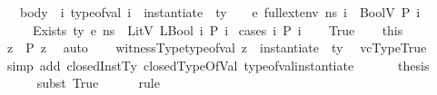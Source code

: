 \begin{isabellebody}
\ \ \ body{\isacharcolon}{\kern0pt}\ {\isachardoublequoteopen}{\isasymAnd}\ i{\isachardot}{\kern0pt}\ type{\isacharunderscore}{\kern0pt}of{\isacharunderscore}{\kern0pt}val\ i\ {\isacharequal}{\kern0pt}\ instantiate\ {\isasymOmega}\ ty\ {\isasymLongrightarrow}\ {\isasymLambda}{\isacharcomma}{\kern0pt}{\isasymGamma}{\isacharcomma}{\kern0pt}{\isasymOmega}\ {\isasymturnstile}\ {\isasymlangle}e{\isacharcomma}{\kern0pt}\ full{\isacharunderscore}{\kern0pt}ext{\isacharunderscore}{\kern0pt}env\ ns\ i{\isasymrangle}\ {\isasymDown}\ BoolV\ {\isacharparenleft}{\kern0pt}P\ i{\isacharparenright}{\kern0pt}{\isachardoublequoteclose}\isanewline
\ \ \ {\isachardoublequoteopen}{\isasymLambda}{\isacharcomma}{\kern0pt}{\isasymGamma}{\isacharcomma}{\kern0pt}{\isasymOmega}\ {\isasymturnstile}\ {\isasymlangle}Exists\ ty\ e{\isacharcomma}{\kern0pt}\ ns{\isasymrangle}\ {\isasymDown}\ LitV\ {\isacharparenleft}{\kern0pt}LBool\ {\isacharparenleft}{\kern0pt}{\isasymexists}i{\isachardot}{\kern0pt}\ P\ i{\isacharparenright}{\kern0pt}{\isacharparenright}{\kern0pt}{\isachardoublequoteclose}\isanewline
%
\isadelimproof
%
\endisadelimproof
%
\isatagproof
{}\isamarkupfalse%
\ {\isacharparenleft}{\kern0pt}cases\ {\isachardoublequoteopen}{\isasymexists}i{\isachardot}{\kern0pt}\ P\ i{\isachardoublequoteclose}{\isacharparenright}{\kern0pt}\isanewline
\ \ \isamarkupfalse%
\ True\isanewline
\ \ \isamarkupfalse%
\ this\ \isamarkupfalse%
\ z\ \ {\isachardoublequoteopen}P\ z{\isachardoublequoteclose}\ \isamarkupfalse%
\ auto\isanewline
\ \ \isamarkupfalse%
\ witnessType{\isacharcolon}{\kern0pt}{\isachardoublequoteopen}type{\isacharunderscore}{\kern0pt}of{\isacharunderscore}{\kern0pt}val\ z\ {\isacharequal}{\kern0pt}\ instantiate\ {\isasymOmega}\ ty{\isachardoublequoteclose}\ \isamarkupfalse%
\ vcTypeTrue\isanewline
\ \ \ \ \isamarkupfalse%
\ {\isacharparenleft}{\kern0pt}simp\ add{\isacharcolon}{\kern0pt}\ closedInstTy\ closedTypeOfVal\ type{\isacharunderscore}{\kern0pt}of{\isacharunderscore}{\kern0pt}val{\isacharunderscore}{\kern0pt}instantiate{\isacharparenright}{\kern0pt}\ \isanewline
\ \ \isamarkupfalse%
\ \isamarkupfalse%
\ {\isacharquery}{\kern0pt}thesis\isanewline
\ \ \ \ \isamarkupfalse%
\ {\isacharparenleft}{\kern0pt}subst\ True{\isacharparenright}{\kern0pt}\isanewline
\ \ \ \ \isamarkupfalse%
\ rule\isanewline

\end{isabellebody}
